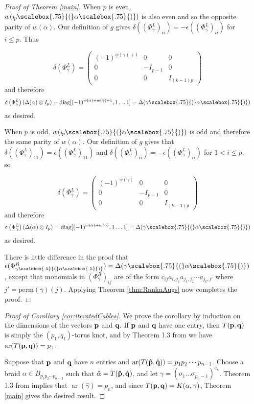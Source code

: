 \documentclass[11pt]{amsart}
\def\ar{\operatorname{ar}}
\newcommand*{\smallp}[1]{\scalebox{.75}{\ensuremath#1}}
\newcommand*{\subsmallp}[1]{\scalebox{.5}{\ensuremath#1}}
\newcommand{\pp}[2][p]{\imath_{\hspace*{-1pt}#1}\hspace*{-.5pt}\smallp(#2\smallp)}
\newcommand\diag{\operatorname{diag}}
\theoremstyle{definition}
\begin{document}
\begin{proof}[Proof of Theorem \ref{main}]
When $p$ is even, $w(\pp\alpha)$ is also even and so the opposite parity of $w(\alpha)$. Our definition of $g$ gives $\delta\left(\left(\Phi_{\bar\gamma}^L\right)_{ii}\right) = -\epsilon\left(\left(\Phi_{\bar\gamma}^L\right)_{ii}\right)$ for $i\le p$. Thus 

$$\delta\left(\Phi_{\bar\gamma}^L\right) = 
\left( \begin{array}{ccc}
(-1)^{w(\bar\gamma)+1} & 0 & 0 \\
0 & -I_{p-1} & 0 \\
0 & 0 & I_{(k-1)p} \end{array} \right)
$$
\noindent and therefore
$$
\delta\left(\Phi_{\bar\gamma}^L\right)\left(\Delta(\alpha)\otimes I_p\right) = \diag[(-1)^{w(\alpha) + w(\bar\gamma) + 1},1\ldots 1] = \Delta(\gamma\smallp(\alpha\smallp))
$$
\noindent as desired.

When $p$ is odd, $w(\pp\alpha)$ is odd and therefore the same parity of $w(\alpha)$. Our definition of $g$ gives that $\delta\left(\left(\Phi_{\bar\gamma}^L\right)_{11}\right) = \epsilon\left(\left(\Phi_{\bar\gamma}^L\right)_{11}\right)$ and $\delta\left(\left(\Phi_{\bar\gamma}^L\right)_{ii}\right) = -\epsilon\left(\left(\Phi_{\bar\gamma}^L\right)_{ii}\right)$ for $1<i\le p$, so 

$$\delta\left(\Phi_{\bar\gamma}^L\right) = 
\left( \begin{array}{ccc}
(-1)^{w(\bar\gamma)} & 0 & 0 \\
0 & -I_{p-1} & 0 \\
0 & 0 & I_{(k-1)p} \end{array} \right)
$$
\noindent and therefore
$$
\delta\left(\Phi_{\bar\gamma}^L\right)\left(\Delta(\alpha)\otimes I_p\right)= \diag[(-1)^{w(\alpha) + w(\bar\gamma)},1\ldots 1] = \Delta(\gamma\smallp(\alpha\smallp))
$$
\noindent as desired. 

There is little difference in the proof that $\epsilon(\Phi_{\gamma\subsmallp(\alpha\subsmallp)}^R) = \Delta(\gamma\smallp(\alpha\smallp))$, except that monomials in $(\Phi_{\bar\gamma}^R)_{ij}$ are of the form $c_{ij}a_{i,j_1}a_{j_1,j_2}\cdots a_{j_k,j'}$ where $j'=\text{perm}(\bar\gamma)(j)$. Applying Theorem \ref{thm:RanknAugs} now completes the proof.
\end{proof}

\begin{proof}[Proof of Corollary \ref{cor:iteratedCables}]
We prove the corollary by induction on the dimensions of the vectors ${\bf p}$ and ${\bf q}$.  If ${\bf p}$ and ${\bf q}$ have one entry, then $T({\bf p},{\bf q})$ is simply the $(p_1,q_1)$-torus knot, and by Theorem 1.3 from \cite{Cor13b} we have $\ar(T({\bf p},{\bf q})) = p_1$.

Suppose that ${\bf p}$ and ${\bf q}$ have $n$ entries and $\ar(T({\bf \hat p},{\bf \hat q})) = p_1p_2\cdots p_{n-1}$.  Choose a braid $\alpha\in B_{p_1p_2\cdots p_{n-1}}$ such that $\hat\alpha = T({\bf \hat p},{\bf \hat q})$, and let $\gamma = (\sigma_1\ldots \sigma_{p_n-1})^{q_n}$.  Theorem 1.3 from \cite{Cor13b} implies that $\ar(\hat\gamma) = p_n$, and since $T({\bf p},{\bf q}) = K(\alpha,\gamma)$, Theorem \ref{main} gives the desired result.
\end{proof}
\end{document}
